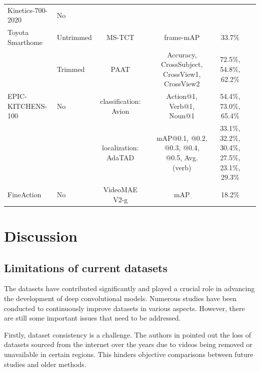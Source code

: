 \documentclass[a4paper]{article}
\begin{document}
\begin{table}
\begin{tabular}{l|l|c c c c c}
		Kinetics-700-2020       & No            &                               &                      &                                                &                                                      \\
		Toyota Smarthome        & Untrimmed     & MS-TCT                        & \cite{MS-TCT}        & frame-mAP                                      & 33.7\%	                                    \\
								& Trimmed       & PAAT                          & \cite{PAAT}          & Accuracy, CrossSubject, CrossView1, CrossView2 & 72.5\%, 54.8\%, 62.2\%	  \\
		EPIC-KITCHENS-100       & No            & classification: Avion         & \cite{Avion}         & Action@1, Verb@1, Noun@1                       & 54.4\%, 73.0\%, 65.4\%                            \\	
								&               & localization: AdaTAD          & \cite{AdaTAD}        & mAP@0.1, @0.2, @0.3, @0.4, @0.5, Avg. (verb)   & 33.1\%, 32.2\%, 30.4\%, 27.5\%, 23.1\%, 29.3\% \\
		FineAction              & No            & VideoMAE V2-g                 & \cite{VideoMAEV2g}   & mAP                                            & 18.2\%                   \\
		\bottomrule
		
	\end{tabular}%
	\label{SOTAMethod}
\end{table}%


\section{Discussion}

\subsection{Limitations of current datasets}

The datasets have contributed significantly and played a crucial role in advancing the development of deep convolutional models. Numerous studies have been conducted to continuously improve datasets in various aspects. However, there are still some important issues that need to be addressed.

Firstly, dataset consistency is a challenge. The authors in \cite{AViD} pointed out the loss of datasets sourced from the internet over the years due to videos being removed or unavailable in certain regions. This hinders objective comparisons between future studies and older methods.
\end{document}
